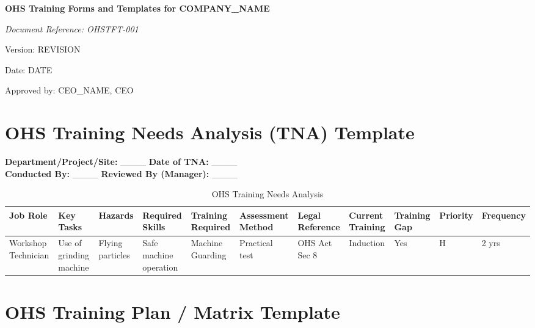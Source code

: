\documentclass[12pt]{article}
\begin{document}
\begin{titlepage}
    \centering
    \vspace*{2cm}
    {\LARGE\bfseries OHS Training Forms and Templates for {{COMPANY_NAME}}\par}
    \vspace{1cm}
    {\large\itshape Document Reference: OHSTFT-001\par}
    \vspace{0.5cm}
    {\normalsize Version: {{REVISION}}\par}
    \vspace{0.5cm}
    {\normalsize Date: {{DATE}}\par}
    \vspace{2cm}
    {\normalsize Approved by: {{CEO_NAME}}, CEO\par}
\end{titlepage}

\section{OHS Training Needs Analysis (TNA) Template}

\textbf{Department/Project/Site:} \_\_\_\_ \textbf{Date of TNA:} \_\_\_\_\\
\textbf{Conducted By:} \_\_\_\_ \textbf{Reviewed By (Manager):} \_\_\_\_

\begin{table}[h]
    \centering
    \begin{tabular}{p{2cm}p{3cm}p{2cm}p{2cm}p{3cm}p{2cm}p{2cm}p{2cm}p{2cm}p{2cm}p{2cm}}
        \toprule
        \textbf{Job Role} & \textbf{Key Tasks} & \textbf{Hazards} & \textbf{Required Skills} & \textbf{Training Required} & \textbf{Assessment Method} & \textbf{Legal Reference} & \textbf{Current Training} & \textbf{Training Gap} & \textbf{Priority} & \textbf{Frequency} \\
        \midrule
        Workshop Technician & Use of grinding machine & Flying particles & Safe machine operation & Machine Guarding & Practical test & OHS Act Sec 8 & Induction & Yes & H & 2 yrs \\
        \bottomrule
    \end{tabular}
    \caption{OHS Training Needs Analysis}
\end{table}

\section{OHS Training Plan / Matrix Template}
\end{document}

